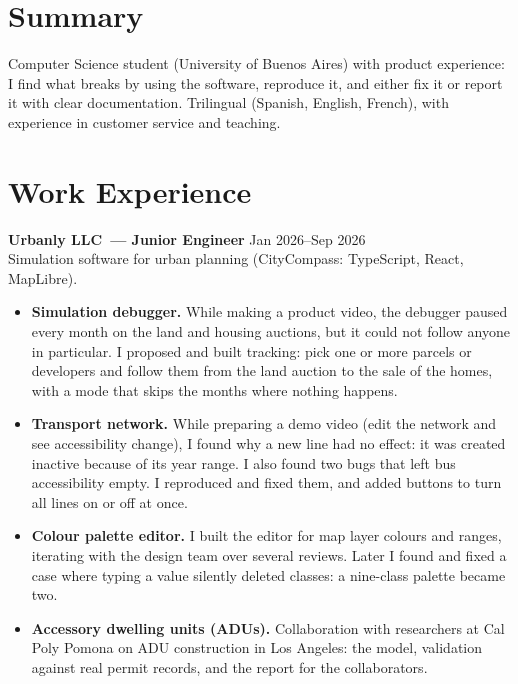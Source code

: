 

\section*{Summary}
Computer Science student (University of Buenos Aires) with product experience: I find what breaks by
using the software, reproduce it, and either fix it or report it with clear documentation.
Trilingual (Spanish, English, French), with experience in customer service and teaching.

\section*{Work Experience}
\textbf{Urbanly LLC~--- Junior Engineer} \hfill Jan 2026--Sep 2026 \\
Simulation software for urban planning (CityCompass: TypeScript, React, MapLibre).
\begin{itemize}
  \item \textbf{Simulation debugger.} While making a product video, the debugger paused every month on the
        land and housing auctions, but it could not follow anyone in particular. I proposed and built tracking:
        pick one or more parcels or developers and follow them from the land auction to the sale of the homes,
        with a mode that skips the months where nothing happens.
  \item \textbf{Transport network.} While preparing a demo video (edit the network and see accessibility
        change), I found why a new line had no effect: it was created inactive because of its year range. I also
        found two bugs that left bus accessibility empty. I reproduced and fixed them, and added buttons to turn
        all lines on or off at once.
  \item \textbf{Colour palette editor.} I built the editor for map layer colours and ranges, iterating with
        the design team over several reviews. Later I found and fixed a case where typing a value silently deleted
        classes: a nine-class palette became two.
  \item \textbf{Accessory dwelling units (ADUs).} Collaboration with researchers at Cal Poly Pomona on ADU
        construction in Los Angeles: the model, validation against real permit records, and the report for the
        collaborators.
\end{itemize}


